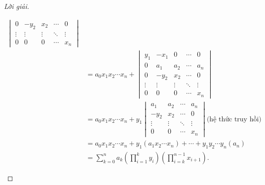 \documentclass[class=nhvh-linear-algebra,crop=false]{standalone}
\begin{document}
\begin{proof}[Lời giải]
\begin{enumerate}[label = (\alph*)]
\begin{align*}
\begin{vmatrix}
				      0      & -y_{2} & x_{2}  & \cdots & 0      \\
				      \vdots & \vdots & \vdots & \ddots & \vdots \\
				      0      & 0      & 0      & \cdots & x_{n}
			      \end{vmatrix}                                                         \\
			       & =
			      a_{0}x_{1}x_{2}\cdots x_{n}
			      +
			      \begin{vmatrix}
				      y_{1}  & -x_{1} & 0      & \cdots & 0      \\
				      0      & a_{1}  & a_{2}  & \cdots & a_{n}  \\
				      0      & -y_{2} & x_{2}  & \cdots & 0      \\
				      \vdots & \vdots & \vdots & \ddots & \vdots \\
				      0      & 0      & 0      & \cdots & x_{n}
			      \end{vmatrix}                                                         \\
			       & =
			      a_{0}x_{1}x_{2}\cdots x_{n}
			      +
			      y_{1}
			      \begin{vmatrix}
				      a_{1}  & a_{2}  & \cdots & a_{n}  \\
				      -y_{2} & x_{2}  & \cdots & 0      \\
				      \vdots & \vdots & \ddots & \vdots \\
				      0      & 0      & \cdots & x_{n}
			      \end{vmatrix} \text{(hệ thức truy hồi)}                                                            \\
			       & = a_{0}x_{1}x_{2}\cdots x_{n}
			      + y_{1} (a_{1}x_{2}\cdots x_{n})
			      + \cdots
			      + y_{1}y_{2}\cdots y_{n} (a_{n})                                                                   \\
			       & = \sum^{n}_{k=0} a_{k}\left(\prod^{k}_{i=1}y_{i}\right)\left(\prod^{n-1}_{i=k}x_{i + 1}\right).
		      \end{align*}
	\end{enumerate}
\end{proof}
\end{document}
